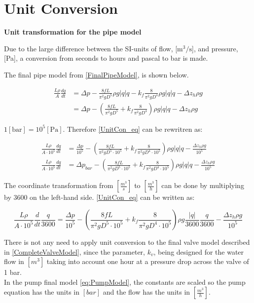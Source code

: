 \chapter{Unit Conversion}
\label{unitCON}
\textbf{Unit transformation for the pipe model}

Due to the large difference between the SI-units of flow, [$\text{m}^3/\text{s}$], and pressure, [Pa], a conversion from seconds to hours and pascal to bar is made.

The final pipe model from \eqref{FinalPipeModel}, is shown below.   

\begin{equation}
\begin{split}
   \frac{L \rho}{A} \frac{dq}{dt} &=\Delta p - \frac{8fL}{\pi^{2}gD^5} \rho g  |q| q - k_f \frac{8}{\pi^2gD^4} \rho g |q| q - \Delta z_h \rho g \\
   &=\Delta p - (\frac{8fL}{\pi^{2}gD^5} + k_f \frac{8}{\pi^2gD^4}) \rho g |q| q - \Delta z_h \rho g
\end{split}
\label{UnitCon_eq}
\end{equation}

$1 [\text{bar}] = 10^5[\text{Pa}]$. Therefore \eqref{UnitCon_eq} can be rewritren as: 

\begin{equation}
\begin{split}
   \frac{L \rho}{A\cdot10^5} \frac{dq}{dt} &=  \frac{\Delta p}{10^5} - (\frac{8fL}{\pi^{2}gD^5\cdot10^5} + k_f \frac{8}{\pi^2gD^4\cdot10^5}) \rho g |q| q - \frac{\Delta z_h \rho g}{10^5}\\
   \frac{L \rho}{A\cdot10^5} \frac{dq}{dt} &= \Delta p_{bar} - (\frac{8fL}{\pi^{2}gD^5\cdot10^5} + k_f \frac{8}{\pi^2gD^4\cdot10^5}) \rho g |q| q - \frac{\Delta z_h \rho g}{10^5}
\end{split}
\end{equation}

The coordinate transformation from $[\frac{m^3}{s}]$ to $[\frac{m^3}{h}]$ can be done by multiplying by 3600 on the left-hand side. \eqref{UnitCon_eq} can be written as:

\begin{equation}
   \frac{L \rho}{A\cdot10^5} \frac{d}{dt}\frac{q}{3600} = \frac{\Delta p}{10^5} - (\frac{8fL}{\pi^{2}gD^5\cdot10^5} + k_f \frac{8}{\pi^2gD^4\cdot10^5}) \rho g \frac{|q|}{3600} \frac{q}{3600} - \frac{\Delta z_h \rho g}{10^5}
\end{equation}

There is not any need to apply unit conversion to the final valve model described in \eqref{CompleteValveModel}, since the parameter, $k_v$, being designed for the water flow in $[m^3]$ taking into account one hour at a pressure drop across the valve of 1 bar. 
\\
In the pump final model \eqref{eq:PumpModel}, the constants are scaled so the pump equation has the units in $[bar]$ and the flow has the units in $[\frac{m^3}{h}]$.

